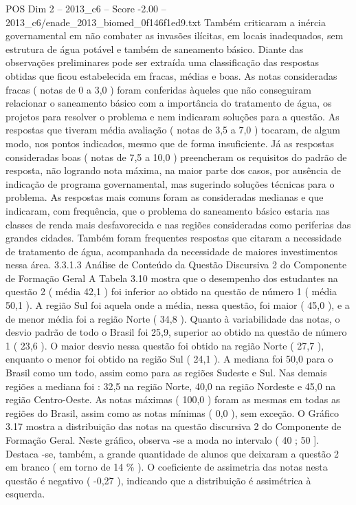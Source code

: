 \begin{textsample}{POS Dim 2 – 2013\_c6 – Score -2.00 – 2013\_c6/enade\_2013\_biomed\_0f146f1ed9.txt}
Também criticaram a inércia governamental em não combater as invasões ilícitas, em locais inadequados, sem estrutura de água potável e também de saneamento básico.
Diante das observações preliminares pode ser extraída uma classificação das respostas obtidas que ficou estabelecida em fracas, médias e boas.
As notas consideradas fracas ( notas de 0 a 3,0 ) foram conferidas àqueles que não conseguiram relacionar o saneamento básico com a importância do tratamento de água, os projetos para resolver o problema e nem indicaram soluções para a questão.
As respostas que tiveram média avaliação ( notas de 3,5 a 7,0 ) tocaram, de algum modo, nos pontos indicados, mesmo que de forma insuficiente.
Já as respostas consideradas boas ( notas de 7,5 a 10,0 ) preencheram os requisitos do padrão de resposta, não logrando nota máxima, na maior parte dos casos, por ausência de indicação de programa governamental, mas sugerindo soluções técnicas para o problema.
As respostas mais comuns foram as consideradas medianas e que indicaram, com frequência, que o problema do saneamento básico estaria nas classes de renda mais desfavorecida e nas regiões consideradas como periferias das grandes cidades.
Também foram frequentes respostas que citaram a necessidade de tratamento de água, acompanhada da necessidade de maiores investimentos nessa área. 3.3.1.3 Análise de Conteúdo da Questão Discursiva 2 do Componente de Formação Geral A Tabela 3.10 mostra que o desempenho dos estudantes na questão 2 ( média 42,1 ) foi inferior ao obtido na questão de número 1 ( média 50,1 ).
A região Sul foi aquela onde a média, nessa questão, foi maior ( 45,0 ), e a de menor média foi a região Norte ( 34,8 ).
Quanto à variabilidade das notas, o desvio padrão de todo o Brasil foi 25,9, superior ao obtido na questão de número 1 ( 23,6 ).
O maior desvio nessa questão foi obtido na região Norte ( 27,7 ), enquanto o menor foi obtido na região Sul ( 24,1 ).
A mediana foi 50,0 para o Brasil como um todo, assim como para as regiões Sudeste e Sul.
Nas demais regiões a mediana foi : 32,5 na região Norte, 40,0 na região Nordeste e 45,0 na região Centro-Oeste.
As notas máximas ( 100,0 ) foram as mesmas em todas as regiões do Brasil, assim como as notas mínimas ( 0,0 ), sem exceção.
O Gráfico 3.17 mostra a distribuição das notas na questão discursiva 2 do Componente de Formação Geral.
Neste gráfico, observa -se a moda no intervalo ( 40 ; 50 ].
Destaca -se, também, a grande quantidade de alunos que deixaram a questão 2 em branco ( em torno de 14 \% ).
O coeficiente de assimetria das notas nesta questão é negativo ( -0,27 ), indicando que a distribuição é assimétrica à esquerda.

\end{textsample}
